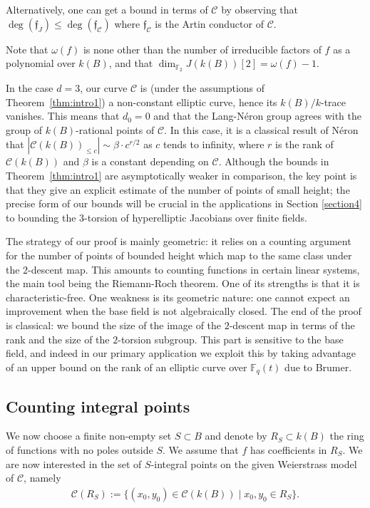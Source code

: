 \documentclass[11pt]{article}
\newcommand{\F}{\ensuremath{\mathbb{F}}}
\theoremstyle{plain}
\theoremstyle{definition}
\begin{document}
Alternatively, one can get a bound in terms of $\mathcal{C}$ by observing that $\deg(\mathfrak{f}_J)\leq \deg(\mathfrak{f}_\mathcal{C})$ where $\mathfrak{f}_\mathcal{C}$ is the Artin conductor of $\mathcal{C}$.


Note that $\omega(f)$ is none other than the number of irreducible factors of $f$ as a polynomial over $k(B)$, and that $\dim_{\F_2} J(k(B))[2] = \omega(f)-1$.

In the case $d=3$, our curve $\mathcal{C}$ is (under the assumptions of Theorem~\ref{thm:intro1}) a non-constant elliptic curve, hence its $k(B)/k$-trace vanishes. This means that $d_0=0$ and that the Lang-N{\'e}ron group agrees with the group of $k(B)$-rational points of $\mathcal{C}$.
In this case, it is a classical result of N{\'e}ron that $|\mathcal{C}(k(B))_{\leq c}|\sim \beta\cdot c^{r/2}$ as $c$ tends to infinity, where $r$ is the rank of $\mathcal{C}(k(B))$ and $\beta$ is a constant depending on $\mathcal{C}$. Although the bounds in Theorem~\ref{thm:intro1} are asymptotically weaker in comparison, the key point is that they give an explicit estimate of the number of points of small height; the precise form of our bounds will be crucial in the applications in Section \ref{section4} to bounding the $3$-torsion of hyperelliptic Jacobians over finite fields.

The strategy of our proof is mainly geometric: it relies on a counting argument for the number of points of bounded height which map to the same class under the $2$-descent map. This amounts to counting functions in certain linear systems, the main tool being the Riemann-Roch theorem. One of its strengths is that it is characteristic-free. One weakness is its geometric nature: one cannot expect an improvement when the base field is not algebraically closed. The end of the proof is classical: we bound the size of the image of the $2$-descent map in terms of the rank and the size of the $2$-torsion subgroup. This part is sensitive to the base field, and indeed in our primary application we exploit this by taking advantage of an upper bound on the rank of an elliptic curve over $\F_q(t)$ due to Brumer.



\subsection*{Counting integral points}

We now choose a finite non-empty set $S\subset B$ and denote by $R_S\subset k(B)$ the ring of functions with no poles outside $S$. We assume that $f$ has coefficients in $R_S$.
We are now interested in the set of $S$-integral points on the given Weierstrass model of $\mathcal{C}$, namely
\begin{align*}
\mathcal{C}(R_S):=\{(x_0,y_0)\in \mathcal{C}(k(B))\mid x_0,y_0\in R_S\}.
\end{align*}
\end{document}
